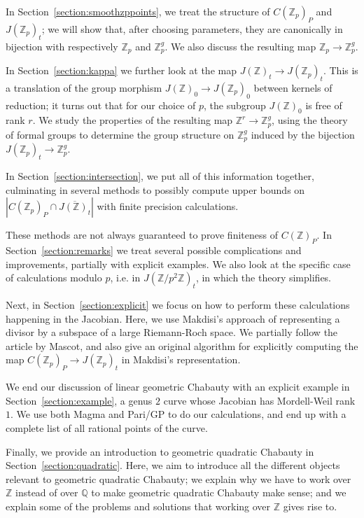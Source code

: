 \documentclass[12pt]{article}
\newcommand{\Z}{\mathbb{Z}}
\newcommand{\Q}{\mathbb{Q}}
\theoremstyle{plain}
\theoremstyle{definition}
\theoremstyle{remark}
\begin{document}
In Section~\ref{section:smoothzppoints}, we treat the structure of $C(\Z_p)_P$ and $J(\Z_p)_t$; we will show that, after choosing parameters, they are canonically in bijection with respectively $\Z_p$ and $\Z_p^g$. We also discuss the resulting map $\Z_p \to \Z_p^g$.

In Section~\ref{section:kappa} we further look at the map $J(\Z)_t \to J(\Z_p)_t$. This is a translation of the group morphism $J(\Z)_0 \to J(\Z_p)_0$ between kernels of reduction; it turns out that for our choice of $p$, the subgroup $J(\Z)_0$ is free of rank $r$. We study the properties of the resulting map $\Z^r \to \Z_p^g$, using the theory of formal groups to determine the group structure on $\Z_p^g$ induced by the bijection $J(\Z_p)_t \to \Z_p^g$.

In Section~\ref{section:intersection}, we put all of this information together, culminating in several methods to possibly compute upper bounds on $\left|C(\Z_p)_P \cap \overline{J(\Z)_t}\right|$ with finite precision calculations.

These methods are not always guaranteed to prove finiteness of $C(\Z)_P$. In Section~\ref{section:remarks} we treat several possible complications and improvements, partially with explicit examples. We also look at the specific case of calculations modulo $p$, i.e. in $J(\Z/p^2\Z)_t$, in which the theory simplifies. 

Next, in Section~\ref{section:explicit} we focus on how to perform these calculations happening in the Jacobian. Here, we use Makdisi's approach of representing a divisor by a subspace of a large Riemann-Roch space. We partially follow the article \citep{mascot2018} by Mascot, and also give an original algorithm for explicitly computing the map $C(\Z_p)_P \to J(\Z_p)_t$ in Makdisi's representation.

We end our discussion of linear geometric Chabauty with an explicit example in Section~\ref{section:example}, a genus $2$ curve whose Jacobian has Mordell-Weil rank $1$. We use both Magma and Pari/GP to do our calculations, and end up with a complete list of all rational points of the curve.

Finally, we provide an introduction to geometric quadratic Chabauty in Section~\ref{section:quadratic}. Here, we aim to introduce all the different objects relevant to geometric quadratic Chabauty; we explain why we have to work over $\Z$ instead of over $\Q$ to make geometric quadratic Chabauty make sense; and we explain some of the problems and solutions that working over $\Z$ gives rise to. 
\end{document}
